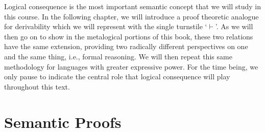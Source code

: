 Logical consequence is the most important semantic concept that we will study in this course.
In the following chapter, we will introduce a proof theoretic analogue for derivability which we will represent with the single turnstile `$\vdash$'.
As we will then go on to show in the metalogical portions of this book, these two relations have the same extension, providing two radically different perspectives on one and the same thing, i.e., formal reasoning.
We will then repeat this same methodology for languages with greater expressive power.
For the time being, we only pause to indicate the central role that logical consequence will play throughout this text.



%
%
%
%




\section{Semantic Proofs}
  \label{sec:SemanticProofs}

